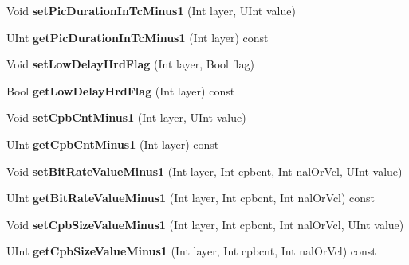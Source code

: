 \begin{DoxyCompactItemize}
\mbox{\label{class_t_com_h_r_d_a5e3513b3af34bfe57e30611fc9edb469}} 
Void {\bfseries set\+Pic\+Duration\+In\+Tc\+Minus1} (Int layer, U\+Int value)
\item 
\mbox{\label{class_t_com_h_r_d_a6dce3492f7dd3341c5e2504477cd5cf3}} 
U\+Int {\bfseries get\+Pic\+Duration\+In\+Tc\+Minus1} (Int layer) const
\item 
\mbox{\label{class_t_com_h_r_d_ae15f9ad27995dc95ec2cc74adbdaf5a6}} 
Void {\bfseries set\+Low\+Delay\+Hrd\+Flag} (Int layer, Bool flag)
\item 
\mbox{\label{class_t_com_h_r_d_af97c81e5e1ea47ee8a6c7bce689d7ea3}} 
Bool {\bfseries get\+Low\+Delay\+Hrd\+Flag} (Int layer) const
\item 
\mbox{\label{class_t_com_h_r_d_a57614e66a5e9530d5cf0ed604cdaea1a}} 
Void {\bfseries set\+Cpb\+Cnt\+Minus1} (Int layer, U\+Int value)
\item 
\mbox{\label{class_t_com_h_r_d_aef18858addc7c5ffdbf138bcfdf9b291}} 
U\+Int {\bfseries get\+Cpb\+Cnt\+Minus1} (Int layer) const
\item 
\mbox{\label{class_t_com_h_r_d_aab94ef6c37a31f469d9186f376fe3fce}} 
Void {\bfseries set\+Bit\+Rate\+Value\+Minus1} (Int layer, Int cpbcnt, Int nal\+Or\+Vcl, U\+Int value)
\item 
\mbox{\label{class_t_com_h_r_d_a085984e2da939a067cc6767aefc5ca9e}} 
U\+Int {\bfseries get\+Bit\+Rate\+Value\+Minus1} (Int layer, Int cpbcnt, Int nal\+Or\+Vcl) const
\item 
\mbox{\label{class_t_com_h_r_d_a270aa20e32f679885a57f3381f3888c5}} 
Void {\bfseries set\+Cpb\+Size\+Value\+Minus1} (Int layer, Int cpbcnt, Int nal\+Or\+Vcl, U\+Int value)
\item 
\mbox{\label{class_t_com_h_r_d_aba8c66aef99e25ca0ec26f00a9510928}} 
U\+Int {\bfseries get\+Cpb\+Size\+Value\+Minus1} (Int layer, Int cpbcnt, Int nal\+Or\+Vcl) const
\item 

\end{DoxyCompactItemize}
